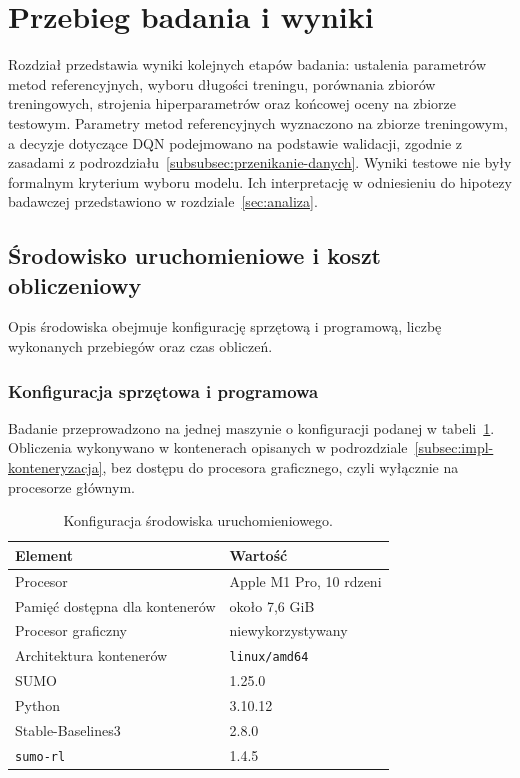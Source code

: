 \clearpage
\section{Przebieg badania i wyniki}
\label{sec:wyniki}

Rozdział przedstawia wyniki kolejnych etapów badania: ustalenia parametrów metod referencyjnych, wyboru długości treningu, porównania zbiorów treningowych, strojenia hiperparametrów oraz końcowej oceny na zbiorze testowym. Parametry metod referencyjnych wyznaczono na zbiorze treningowym, a decyzje dotyczące DQN podejmowano na podstawie walidacji, zgodnie z zasadami z podrozdziału~\ref{subsubsec:przenikanie-danych}. Wyniki testowe nie były formalnym kryterium wyboru modelu. Ich interpretację w odniesieniu do hipotezy badawczej przedstawiono w rozdziale~\ref{sec:analiza}.

\subsection{Środowisko uruchomieniowe i koszt obliczeniowy}
\label{subsec:srodowisko-uruchomieniowe}

Opis środowiska obejmuje konfigurację sprzętową i programową, liczbę wykonanych przebiegów oraz czas obliczeń.

\subsubsection{Konfiguracja sprzętowa i programowa}
\label{subsubsec:konfiguracja-sprzetowa}

Badanie przeprowadzono na jednej maszynie o konfiguracji podanej w tabeli~\ref{tab:srodowisko}. Obliczenia wykonywano w kontenerach opisanych w podrozdziale~\ref{subsec:impl-konteneryzacja}, bez dostępu do procesora graficznego, czyli wyłącznie na procesorze głównym.

\begin{table}[!htbp] \centering
    \caption{Konfiguracja środowiska uruchomieniowego.}
    \label{tab:srodowisko}
    \small
    \begin{tabular}{| l | l |} \hline
        Element & Wartość \\ \hline\hline
        Procesor                & Apple M1 Pro, 10 rdzeni \\ \hline
        Pamięć dostępna dla kontenerów & około 7,6 GiB \\ \hline
        Procesor graficzny      & niewykorzystywany \\ \hline
        Architektura kontenerów & \texttt{linux/amd64} \\ \hline
        SUMO                    & 1.25.0 \\ \hline
        Python                  & 3.10.12 \\ \hline
        Stable-Baselines3       & 2.8.0 \\ \hline
        \texttt{sumo-rl}        & 1.4.5 \\ \hline
    \end{tabular}
\end{table}

